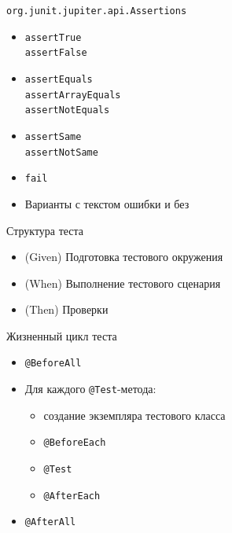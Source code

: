 \documentclass[unicode]{beamer}
\begin{document}
\begin{frame}{\texttt{org.junit.jupiter.api.Assertions}}
\begin{itemize}
\item \lstinline|assertTrue|\\
    \lstinline|assertFalse|
    \bigskip

\item \lstinline|assertEquals|\\
    \lstinline|assertArrayEquals|\\
    \lstinline|assertNotEquals|
    \bigskip

\item \lstinline|assertSame|\\
    \lstinline|assertNotSame|
    \bigskip

\item \lstinline|fail|
    \bigskip

\item Варианты с текстом ошибки и без
\end{itemize}
\end{frame}


\begin{frame}{Структура теста}
\begin{itemize}
\item (Given) Подготовка тестового окружения
    \bigskip

\item (When) Выполнение тестового сценария
    \bigskip

\item (Then) Проверки
\end{itemize}
\end{frame}


\begin{frame}{Жизненный цикл теста}
\begin{itemize}
\item \lstinline|@BeforeAll|
    \bigskip

\item Для каждого \lstinline|@Test|-метода:
    \begin{itemize}
    \item создание экземпляра тестового класса
    \item \lstinline|@BeforeEach|
    \item \lstinline|@Test|
    \item \lstinline|@AfterEach|
    \end{itemize}
    \bigskip

\item \lstinline|@AfterAll|
\end{itemize}
\end{frame}
\end{document}

